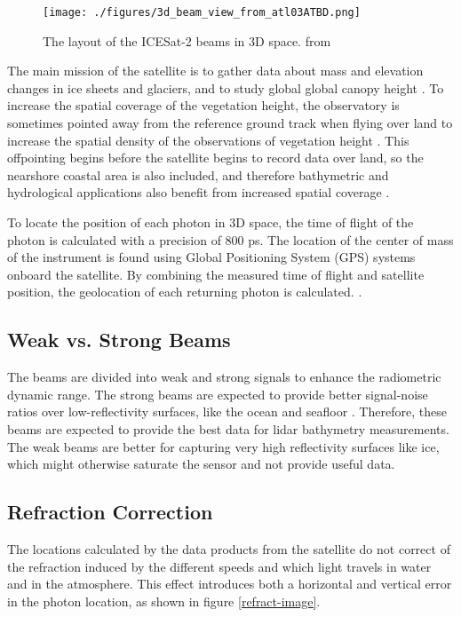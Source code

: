 \begin{figure}[htbp]
      \centering
      \texttt{[image: ./figures/3d\_beam\_view\_from\_atl03ATBD.png]}
      \caption{The layout of the ICESat-2 beams in 3D space. from \cite{Neumann2019d}}
      \label{3d-beams}
\end{figure}


The main mission of the satellite is to gather data about mass and elevation changes in ice sheets and glaciers, and to study global global canopy height \parencite{Markus2017}. To increase the spatial coverage of the vegetation height, the observatory is sometimes pointed away from the reference ground track when flying over land to increase the spatial density of the observations of vegetation height \parencite{Markus2017}. This offpointing begins before the satellite begins to record data over land, so the nearshore coastal area is also included, and therefore bathymetric and hydrological applications also benefit from increased spatial coverage \parencite{Magruder2021}.

To locate the position of each photon in 3D space, the time of flight of the photon is calculated with a precision of 800 ps\parencite{Neumann2019d}. The location of the center of mass of the instrument is found using Global Positioning System (GPS) systems onboard the satellite. By combining the measured time of flight and satellite position, the geolocation of each returning photon is calculated. \parencite{Neumann2019d}.

\subsection{Weak vs. Strong Beams}

The beams are divided into weak and strong signals to enhance the radiometric dynamic range. The strong beams are expected to provide better signal-noise ratios over low-reflectivity surfaces, like the ocean and seafloor \parencite{Neumann2019d}. Therefore, these beams are expected to provide the best data for lidar bathymetry measurements. The weak beams are better for capturing very high reflectivity surfaces like ice, which might otherwise saturate the sensor and not provide useful data.

\subsection{Refraction Correction}

The locations calculated by the data products from the satellite do not correct of the refraction induced by the different speeds and which light travels in water and in the atmosphere. This effect introduces both a horizontal and vertical error in the photon location, as shown in figure \ref{refract-image}.

